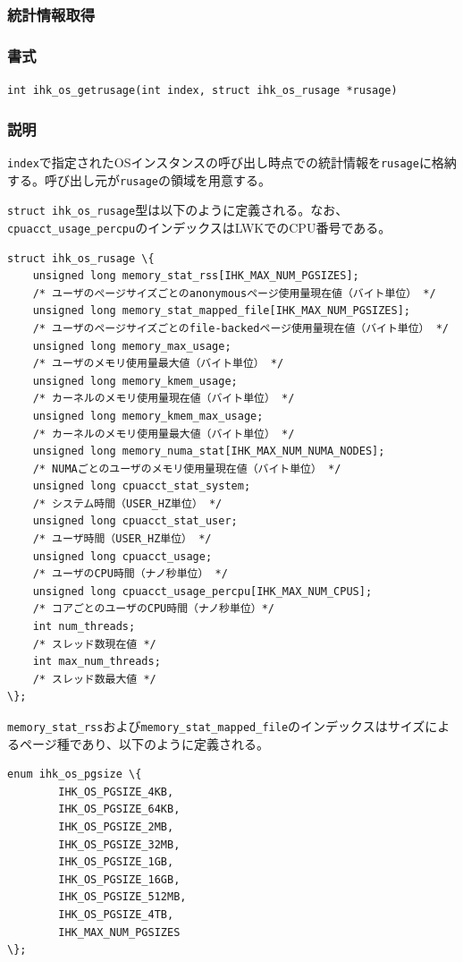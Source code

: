 \documentclass[twoside,11pt,fleqn]{book}
\begin{document}
\subsubsection{統計情報取得}
\subsubsection*{書式}{\quad} \texttt{int ihk\_os\_getrusage(int index, struct ihk\_os\_rusage *rusage)}
\subsubsection*{説明}{\quad} \texttt{index}で指定されたOSインスタンスの呼び出し時点での統計情報を\texttt{rusage}に格納する。呼び出し元が\texttt{rusage}の領域を用意する。

\texttt{struct ihk\_os\_rusage}型は以下のように定義される。なお、\verb|cpuacct_usage_percpu|のインデックスはLWKでのCPU番号である。

\footnotesize
\begin{Verbatim}[commandchars=\\\{\}]
struct ihk_os_rusage \{
    unsigned long memory_stat_rss[IHK_MAX_NUM_PGSIZES];
    /* ユーザのぺージサイズごとのanonymousページ使用量現在値（バイト単位） */
    unsigned long memory_stat_mapped_file[IHK_MAX_NUM_PGSIZES];
    /* ユーザのページサイズごとのfile-backedページ使用量現在値（バイト単位） */
    unsigned long memory_max_usage;
    /* ユーザのメモリ使用量最大値（バイト単位） */
    unsigned long memory_kmem_usage;
    /* カーネルのメモリ使用量現在値（バイト単位） */
    unsigned long memory_kmem_max_usage;
    /* カーネルのメモリ使用量最大値（バイト単位） */
    unsigned long memory_numa_stat[IHK_MAX_NUM_NUMA_NODES];
    /* NUMAごとのユーザのメモリ使用量現在値（バイト単位） */
    unsigned long cpuacct_stat_system;
    /* システム時間（USER_HZ単位） */
    unsigned long cpuacct_stat_user;
    /* ユーザ時間（USER_HZ単位） */
    unsigned long cpuacct_usage;
    /* ユーザのCPU時間（ナノ秒単位） */
    unsigned long cpuacct_usage_percpu[IHK_MAX_NUM_CPUS];
    /* コアごとのユーザのCPU時間（ナノ秒単位）*/
    int num_threads;
    /* スレッド数現在値 */
    int max_num_threads;
    /* スレッド数最大値 */
\};
\end{Verbatim}
\normalsize

\texttt{memory\_stat\_rss}および\texttt{memory\_stat\_mapped\_file}のインデックスはサイズによるページ種であり、以下のように定義される。
\footnotesize
\begin{Verbatim}[commandchars=\\\{\}]
enum ihk_os_pgsize \{
        IHK_OS_PGSIZE_4KB,
        IHK_OS_PGSIZE_64KB,
        IHK_OS_PGSIZE_2MB,
        IHK_OS_PGSIZE_32MB,
        IHK_OS_PGSIZE_1GB,
        IHK_OS_PGSIZE_16GB,
        IHK_OS_PGSIZE_512MB,
        IHK_OS_PGSIZE_4TB,
        IHK_MAX_NUM_PGSIZES
\};
\end{Verbatim}
\normalsize
\end{document}
